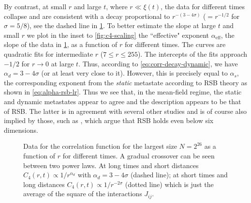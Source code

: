 By contrast, at small $r$ and large $t$, where $r \ll \xi(t)$, the data for
different times collapse and are consistent with a decay proportional to
$r^{-(3-4\sigma)}$ ($=r^{-1/2}$ for $\sigma=5/8$), see the dashed line in
\cref{fig:c4-vs-r-times}. To better estimate the slope at large $t$ and small
$r$ we plot in the inset to \cref{fig:c4-scaling} the ``effective" exponent
$\alpha_{\mathrm{eff}}$, the slope of the data in \cref{fig:c4-vs-r-times}, as
a function of $r$ for different times. The curves are quadratic fits for
intermediate $r$ ($7 \leq r \leq 255$). The intercepts of the fits approach
$-1/2$ for $r \to 0$ at large $t$. Thus, according to
\cref{eq:corr-decay-dynamic}, we have $\alpha_d=3-4\sigma$ (or at least very
close to it). However, this is precisely equal to $\alpha_s$, the corresponding
exponent from the \emph{static} metastate according to RSB theory as shown in
\cref{eq:alpha-rsb-lr}. Thus we see that, in the mean-field regime, the static
and dynamic metastates appear to agree and the description appears to be that
of RSB. The latter is in agreement with several other studies
\autocite{moore2011disappearance,katzgraber2005probing} and is of course also
implied by those, such as \textcite{banos2010nature,banos2010static}, which
argue that RSB holds even below six dimensions.
\begin{figure}
  \centering
  
  \caption[
    Data for the correlation function at different times of the one-dimensional
    long-range diluted spin glass with $\sigma=5/8$ at $T=0.4T_c$.
  ]
  {
    Data for the correlation function for the largest size $N=2^{26}$ as a
    function of $r$ for different times. A gradual crossover can be seen
    between two power laws. At long times and short distances $C_4(r,t) \propto
    1/r^{\alpha_d}$ with $\alpha_d = 3 - 4\sigma$ (dashed line); at short times
    and long distances $C_4(r,t) \propto 1/r^{-2\sigma}$ (dotted line) which is
    just the average of the square of the interactions $J_{ij}$.
  } \label{fig:c4-vs-r-times}
\end{figure}

